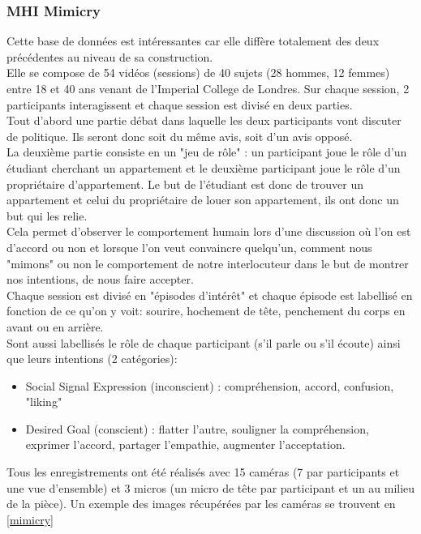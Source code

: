 \documentclass[overfullbox, poster]{polytech/polytech}
\begin{document}
\subsubsection{MHI Mimicry \cite{mimicry1} \cite{mimicry2}}
Cette base de données est intéressantes car elle diffère totalement des deux précédentes au niveau de sa construction.\\
Elle se compose de 54 vidéos (sessions) de 40 sujets (28 hommes, 12 femmes) entre 18 et 40 ans venant de l'Imperial College de Londres. Sur chaque session, 2 participants interagissent et chaque session est divisé en deux parties.\\
Tout d'abord une partie débat dans laquelle les deux participants vont discuter de politique. Ils seront donc soit du même avis, soit d'un avis opposé.\\
La deuxième partie consiste en un "jeu de rôle" : un participant joue le rôle d'un étudiant cherchant un appartement et le deuxième participant joue le rôle d'un propriétaire d'appartement. Le but de l'étudiant est donc de trouver un appartement et celui du propriétaire de louer son appartement, ils ont donc un but qui les relie.\\
Cela permet d'observer le comportement humain lors d'une discussion où l'on est d'accord ou non et lorsque l'on veut convaincre quelqu'un, comment nous "mimons" ou non le comportement de notre interlocuteur dans le but de montrer nos intentions, de nous faire accepter.\\
Chaque session est divisé en "épisodes d’intérêt" et chaque épisode est labellisé en fonction de ce qu'on y voit: sourire, hochement de tête, penchement du corps en avant ou en arrière.\\
Sont aussi labellisés le rôle de chaque participant (s'il parle ou s'il écoute) ainsi que leurs intentions (2 catégories):
\begin{itemize}
\item Social Signal Expression (inconscient) : compréhension, accord, confusion, "liking"
\item Desired Goal (conscient) : flatter l'autre, souligner la compréhension, exprimer l'accord, partager l'empathie, augmenter l'acceptation.\\
\end{itemize}
Tous les enregistrements ont été réalisés avec 15 caméras (7 par participants et une vue d'ensemble) et 3 micros (un micro de tête par participant et un au milieu de la pièce). Un exemple des images récupérées par les caméras se trouvent en \autoref{mimicry}
\end{document}
